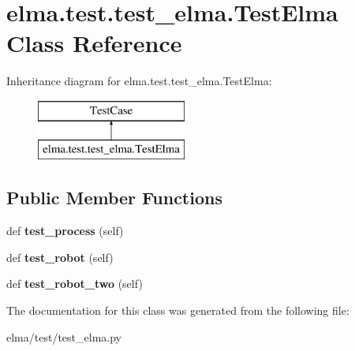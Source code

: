 \hypertarget{classelma_1_1test_1_1test__elma_1_1TestElma}{}\section{elma.\+test.\+test\+\_\+elma.\+Test\+Elma Class Reference}
\label{classelma_1_1test_1_1test__elma_1_1TestElma}
Inheritance diagram for elma.\+test.\+test\+\_\+elma.\+Test\+Elma\+:\begin{figure}[H]
\begin{center}
\leavevmode
\includegraphics[height=2.000000cm]{classelma_1_1test_1_1test__elma_1_1TestElma}
\end{center}
\end{figure}
\subsection*{Public Member Functions}
\begin{DoxyCompactItemize}
\item 
\mbox{\label{classelma_1_1test_1_1test__elma_1_1TestElma_a08a7479359af5f71989bd49ed065391b}} 
def {\bfseries test\+\_\+process} (self)
\item 
\mbox{\label{classelma_1_1test_1_1test__elma_1_1TestElma_a168e8341dac5e84682a83c7dd93c5cc7}} 
def {\bfseries test\+\_\+robot} (self)
\item 
\mbox{\label{classelma_1_1test_1_1test__elma_1_1TestElma_a295c71bd47bb411f73b9715f5846ae2c}} 
def {\bfseries test\+\_\+robot\+\_\+two} (self)
\end{DoxyCompactItemize}


The documentation for this class was generated from the following file\+:\begin{DoxyCompactItemize}
\item 
elma/test/test\+\_\+elma.\+py\end{DoxyCompactItemize}
